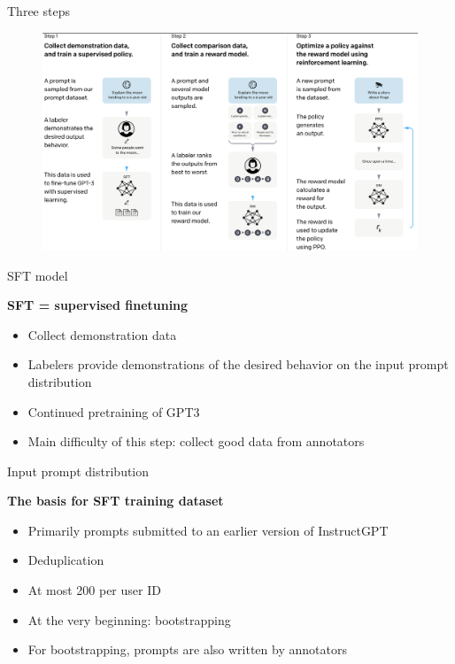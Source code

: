 \begin{vbframe}{Three steps}


\begin{figure}
\centering
\includegraphics[width = 12cm]{figure/threesteps.png}
\end{figure}


\end{vbframe}

\begin{vbframe}{SFT model}

\vfill

\textbf{SFT = supervised finetuning}

	\begin{itemize}
	\item Collect demonstration data
        \item Labelers provide demonstrations of the
          desired behavior on the input prompt distribution
\item Continued pretraining of GPT3
\item Main difficulty of this step: collect good data from annotators                  
	\end{itemize}

\vfill

\end{vbframe}

\begin{vbframe}{Input prompt distribution}

\vfill

\textbf{The basis for SFT training dataset}

	\begin{itemize}
	\item Primarily prompts submitted to an earlier
          version of InstructGPT
          \item Deduplication
        \item At most 200 per user ID
        \item At the very beginning: bootstrapping
          \item For bootstrapping, prompts are also written
            by annotators
	\end{itemize}

\vfill

\end{vbframe}

